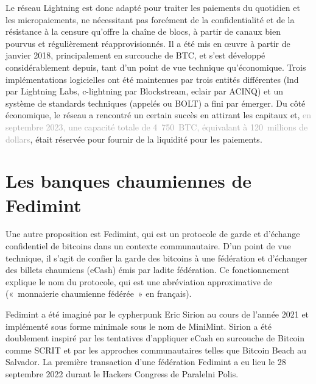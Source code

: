 Le réseau Lightning est donc adapté pour traiter les paiements du quotidien et les micropaiements, ne nécessitant pas forcément de la confidentialité et de la résistance à la censure qu'offre la chaîne de blocs, à partir de canaux bien pourvus et régulièrement réapprovisionnés. Il a été mis en œuvre à partir de janvier 2018, principalement en surcouche de BTC, et s'est développé considérablement depuis, tant d'un point de vue technique qu'économique. Trois implémentations logicielles ont été maintenues par trois entités différentes (lnd par Lightning Labs, c-lightning par Blockstream, eclair par ACINQ) et un système de standards techniques (appelés  ou BOLT) a fini par émerger. Du côté économique, le réseau a rencontré un certain succès en attirant les capitaux et, \textcolor{darkgray}{en septembre 2023, une capacité totale de 4~750~BTC, équivalant à 120~millions de dollars}, était réservée pour fournir de la liquidité pour les paiements.

\section*{Les banques chaumiennes de Fedimint}

Une autre proposition est Fedimint, qui est un protocole de garde et d'échange confidentiel de bitcoins dans un contexte communautaire. D'un point de vue technique, il s'agit de confier la garde des bitcoins à une fédération et d'échanger des billets chaumiens (eCash) émis par ladite fédération. Ce fonctionnement explique le nom du protocole, qui est une abréviation approximative de  («~monnaierie chaumienne fédérée~» en français).

Fedimint a été imaginé par le cypherpunk Eric Sirion au cours de l'année 2021 et implémenté sous forme minimale sous le nom de MiniMint. Sirion a été doublement inspiré par les tentatives d'appliquer eCash en surcouche de Bitcoin comme SCRIT et par les approches communautaires telles que Bitcoin Beach au Salvador. La première transaction d'une fédération Fedimint a eu lieu le 28 septembre 2022 durant le Hackers Congress de Paralelni Polis.

